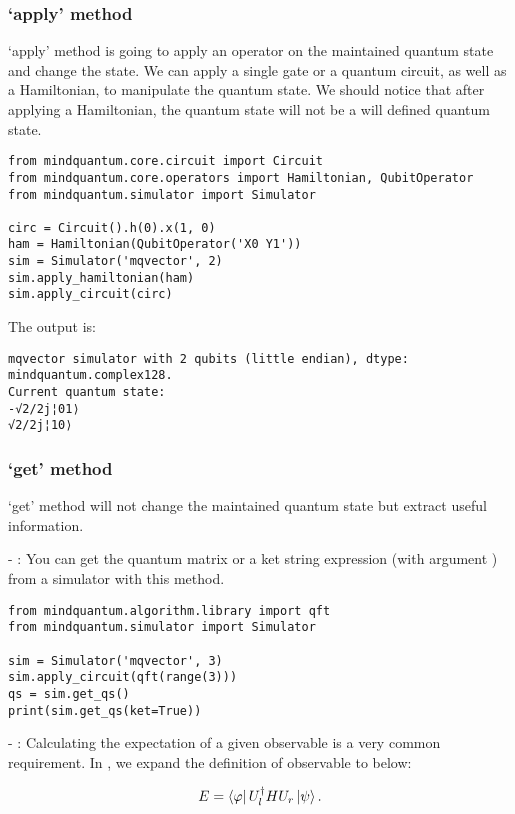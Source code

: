 \subsubsection{`apply' method}

`apply' method is going to apply an operator on the maintained quantum state and change the state. We can apply a single gate or a quantum circuit, as well as a Hamiltonian, to manipulate the quantum state. We should notice that after applying a Hamiltonian, the quantum state will not be a will defined quantum state.

\begin{lstlisting}
from mindquantum.core.circuit import Circuit
from mindquantum.core.operators import Hamiltonian, QubitOperator
from mindquantum.simulator import Simulator

circ = Circuit().h(0).x(1, 0)
ham = Hamiltonian(QubitOperator('X0 Y1'))
sim = Simulator('mqvector', 2)
sim.apply_hamiltonian(ham)
sim.apply_circuit(circ)
\end{lstlisting}
The output is:
\begin{lstlisting}
mqvector simulator with 2 qubits (little endian), dtype: mindquantum.complex128.
Current quantum state:
-√2/2j¦01⟩
√2/2j¦10⟩
\end{lstlisting}

\subsubsection{`get' method}

`get' method will not change the maintained quantum state but extract useful information.

- \getqs: You can get the quantum matrix or a ket string expression (with argument ) from a simulator with this method.
\begin{lstlisting}
from mindquantum.algorithm.library import qft
from mindquantum.simulator import Simulator

sim = Simulator('mqvector', 3)
sim.apply_circuit(qft(range(3)))
qs = sim.get_qs()
print(sim.get_qs(ket=True))
\end{lstlisting}

- \getexpectation: Calculating the expectation of a given observable is a very common requirement. In \MindQuantum, we expand the definition of observable to below:

\begin{equation}
    E = \bra{\varphi}U_l^\dagger H U_r \ket{\psi}.
\end{equation}

